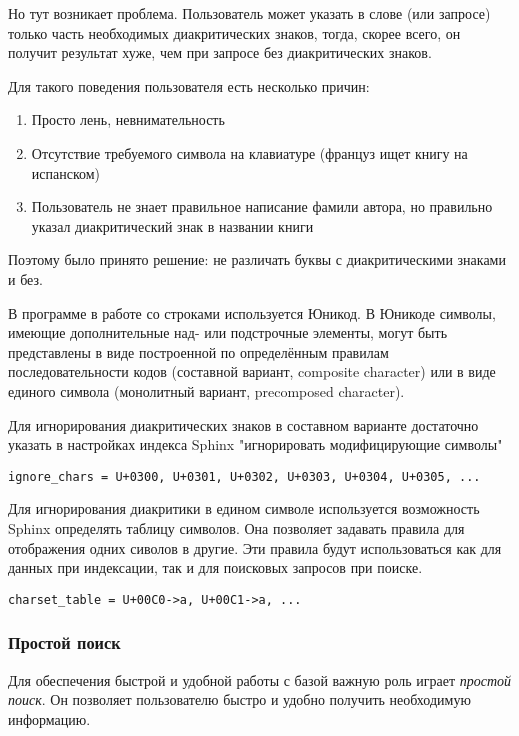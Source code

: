 Но тут возникает проблема. Пользователь может указать в слове (или запросе) только часть необходимых диакритических знаков, тогда, скорее всего, он получит результат хуже, чем при запросе без диакритических знаков. 

Для такого поведения пользователя есть несколько причин:
\begin{enumerate}
    \item Просто лень, невнимательность 
    \item Отсутствие требуемого символа на клавиатуре (француз ищет книгу на испанском) 
    \item Пользователь не знает правильное написание фамили автора, но правильно указал диакритический знак в названии книги 
\end{enumerate}

Поэтому было принято решение: не различать буквы с диакритическими знаками и без.

В программе в работе со строками используется Юникод.
В Юникоде символы, имеющие дополнительные над- или подстрочные элементы, 
могут быть представлены в виде построенной по определённым правилам последовательности кодов (составной вариант, composite character) \cite{compositechar} 
или в виде единого символа (монолитный вариант, precomposed character).

Для игнорирования диакритических знаков в составном варианте достаточно указать в настройках индекса Sphinx "игнорировать модифицирующие символы"
\begin{verbatim}
ignore_chars = U+0300, U+0301, U+0302, U+0303, U+0304, U+0305, ...
\end{verbatim}
Для игнорирования диакритики в едином символе используется возможность Sphinx определять таблицу символов. Она позволяет задавать правила для отображения одних сиволов в другие.
Эти правила будут использоваться как для данных при индексации, так и для поисковых запросов при поиске.
\begin{verbatim}
charset_table = U+00C0->a, U+00C1->a, ...
\end{verbatim}

\subsubsection{Простой поиск}

Для обеспечения быстрой и удобной работы с базой важную роль играет {\em простой поиск}.
Он позволяет пользователю быстро и удобно получить необходимую информацию.

